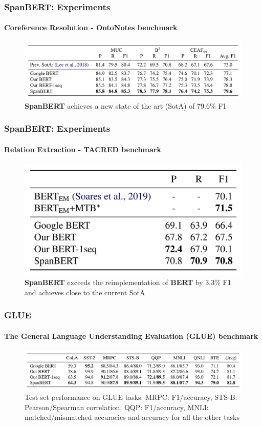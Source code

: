 \documentclass[12pt]{beamer}
\begin{document}
	\begin{frame}
		\frametitle{SpanBERT: Experiments}
		\framesubtitle{Coreference Resolution - OntoNotes benchmark}
		
		\begin{figure}
			\centering
			\includegraphics[width=\textwidth]{cres.png}
			\caption{\textbf{SpanBERT} achieves a new state of the art (SotA) of 79.6\% F1}
		\end{figure}
		
	\end{frame}	
	
	\begin{frame}
		\frametitle{SpanBERT: Experiments}
		\framesubtitle{Relation Extraction - TACRED benchmark}
		
		\begin{figure}
			\centering
			\includegraphics[width=\textwidth]{rele.png}
			\caption{\textbf{SpanBERT} exceeds the reimplementation of \textbf{BERT} by 3.3\% F1 and achieves close to the current SotA}
		\end{figure}
		
	\end{frame}	

    \begin{frame}
        \frametitle{GLUE}
        \framesubtitle{The General Language Understanding Evaluation (GLUE) benchmark}

        \begin{figure}
			\centering
			\includegraphics[width=\textwidth]{glue.png}
			\caption{Test set performance on GLUE tasks. MRPC: F1/accuracy, STS-B: Pearson/Spearman correlation, QQP: F1/accuracy, MNLI: matched/mismatched accuracies and accuracy for all the other tasks}
		\end{figure}
        
    \end{frame}
 
\end{document}
